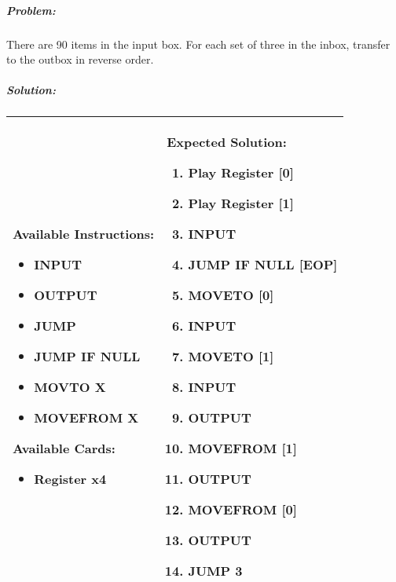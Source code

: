 \subparagraph{Problem:} There are 90 items in the input box. For each set of three in the inbox, transfer to the outbox in reverse order.

\subparagraph{Solution:} 
\begin{center}
    \begin{tabular}{ | m{5cm} | m{9cm} | } 
        \hline
            \textbf{Available Instructions:} 
            \begin{itemize}
                \setlength\itemsep{-.35em}
                \item INPUT
                \item OUTPUT
                \item JUMP
                \item JUMP IF NULL
                \item MOVTO X
                \item MOVEFROM X
            \end{itemize}
            \textbf{Available Cards:} 
            \begin{itemize}
                \setlength\itemsep{-.35em}
                \item Register x4
            \end{itemize}& 
            \textbf{Expected Solution:} 
            \begin{enumerate}
                \setlength\itemsep{-.35em}
                \item Play Register [0]
                \item Play Register [1]
                \item INPUT
                \item JUMP IF NULL [EOP]
                \item MOVETO [0]
                \item INPUT
                \item MOVETO [1]
                \item INPUT
                \item OUTPUT
                \item MOVEFROM [1] 
                \item OUTPUT
                \item MOVEFROM [0]
                \item OUTPUT
                \item JUMP 3
            \end{enumerate}
            \\
        \hline
    \end{tabular}
\end{center}

